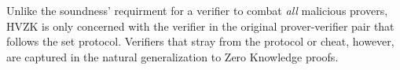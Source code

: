 		Unlike the soundness' requirment for a verifier to combat \textit{all} malicious provers, HVZK is only concerned with the verifier in the original prover-verifier pair that follows the set protocol.  Verifiers that stray from the protocol or cheat, however, are captured in the natural generalization to Zero Knowledge proofs.  
%		

